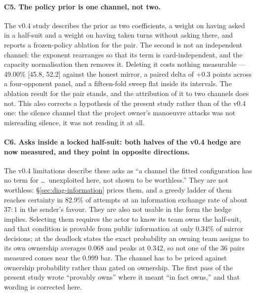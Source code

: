 \documentclass[11pt]{article}
\theoremstyle{definition}
\providecommand{\numLadderRate}{82.9}
\providecommand{\numLeakRatio}{37}
\providecommand{\numOwnProbPairs}{36}
\providecommand{\numOwnProbMean}{0.068}
\providecommand{\numOwnProbMax}{0.342}
\providecommand{\numProvableThresh}{0.999}
\providecommand{\numPhiWin}{49.00}
\providecommand{\numPhiCI}{45.8, 52.2}
\providecommand{\numPhiPaired}{+0.3}
\providecommand{\numProvableOwn}{0.34}
\begin{document}
\paragraph{C5. The policy prior is one channel, not two.} The v0.4 study
describes the prior as two coefficients, a weight on having asked in a half-suit
and a weight on having taken turns without asking there, and reports a
frozen-policy ablation for the pair. The second is not an independent channel:
the exponent rearranges so that its term is card-independent, and the capacity
normalisation then removes it. Deleting it costs nothing measurable ---
\numPhiWin\% [\numPhiCI] against the honest mirror, a paired delta of
\numPhiPaired{} points across a four-opponent panel, and a fifteen-fold sweep flat
inside its intervals. The ablation result for the pair stands, and the
attribution of it to two channels does not. This also corrects a hypothesis of
the present study rather than of the v0.4 one: the silence channel that the
project owner's manoeuvre attacks was not misreading silence, it was not reading
it at all.

\paragraph{C6. Asks inside a locked half-suit: both halves of the v0.4 hedge are
now measured, and they point in opposite directions.} The v0.4 limitations
describe these asks as ``a channel the fitted configuration has no term for
\dots\ unexploited here, not shown to be worthless.'' They are not worthless:
\S\ref{sec:diag-information} prices them, and a greedy ladder of them reaches
certainty in \numLadderRate\% of attempts at an information exchange rate of
about $\numLeakRatio\!:\!1$ in the sender's favour. They are also not usable in
the form the hedge implies. Selecting them requires the actor to know its team
owns the half-suit, and that condition is provable from public information at
only \numProvableOwn\% of mirror decisions; at the deadlock states the exact
probability an owning team assigns to its own ownership averages
\numOwnProbMean{} and peaks at \numOwnProbMax{}, so not one of the
\numOwnProbPairs{} pairs measured comes near the \numProvableThresh{} bar. The channel has to be priced against ownership probability rather
than gated on ownership. The first pass of the present study wrote ``provably
owns'' where it meant ``in fact owns,'' and that wording is corrected here.
\end{document}
